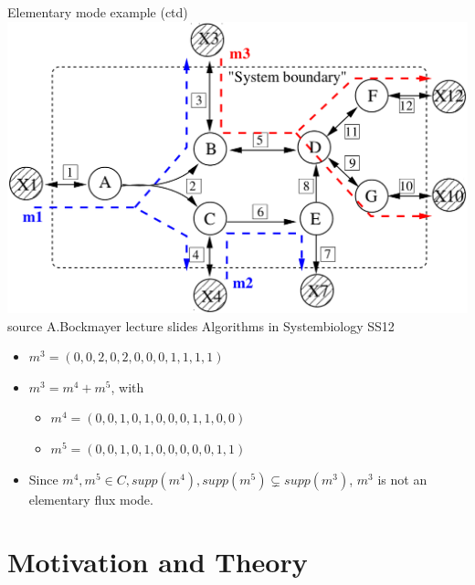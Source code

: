 \documentclass{beamer}
\begin{document}
\begin{frame}{Elementary mode example (ctd)}
    \includegraphics[width=.7\textwidth]{grafik/EMnet2}
    \\
    \hfill \tiny{source A.Bockmayer lecture slides Algorithms in Systembiology SS12}
    \normalsize
    \begin{itemize}
        \item $m^{3} = (0, 0, 2, 0, 2, 0, 0, 0, 1, 1, 1 ,1)$
        \item $m^{3} = m^{4} + m^{5}$, with
        \begin{itemize}
            \item $ m^{4} = (0, 0, 1, 0, 1, 0, 0, 0, 1, 1, 0 ,0)$
            \item $ m^{5} = (0, 0, 1, 0, 1, 0, 0, 0, 0, 0, 1 ,1)$
        \end{itemize}
        \item Since $m^{4}, m^{5} \in C, supp(m^{4}), supp(m^{5}) \subsetneq supp(m^{3})$, $m^{3}$ is not an elementary flux mode.
    \end{itemize}
\end{frame}

\section{Motivation and Theory}
\end{document}
